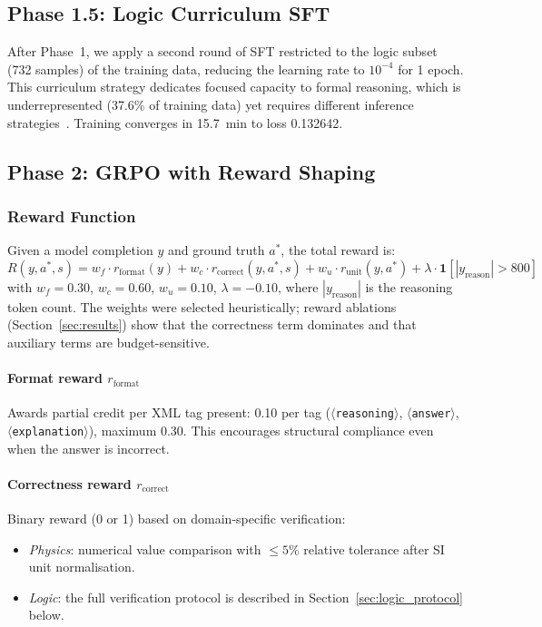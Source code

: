 \documentclass[cmc,journal,article,submit,moreauthors,pdftex]{Definitions/tsp}
\begin{document}
\subsection{Phase 1.5: Logic Curriculum SFT}

After Phase~1, we apply a second round of SFT restricted to the logic
subset (732 samples) of the training data, reducing the learning rate
to $10^{-4}$ for 1 epoch.
This curriculum strategy dedicates focused capacity to formal reasoning,
which is underrepresented (37.6\% of training data) yet requires
different inference strategies~\cite{Bengio2009}.
Training converges in 15.7~min to loss 0.132642.

\subsection{Phase 2: GRPO with Reward Shaping}\label{sec:grpo}

\subsubsection{Reward Function}

Given a model completion $y$ and ground truth $a^*$, the total reward is:
\begin{equation}
  R(y, a^*, s) =
    w_f \cdot r_{\text{format}}(y)
  + w_c \cdot r_{\text{correct}}(y, a^*, s)
  + w_u \cdot r_{\text{unit}}(y, a^*)
  + \lambda \cdot \mathbf{1}[|y_{\text{reason}}| > 800]
  \tag{4}
  \label{eq:reward}
\end{equation}
with $w_f = 0.30$, $w_c = 0.60$, $w_u = 0.10$, $\lambda = -0.10$,
where $|y_{\text{reason}}|$ is the reasoning token count.
The weights were selected heuristically; reward ablations
(Section~\ref{sec:results}) show that the correctness term dominates
and that auxiliary terms are budget-sensitive.

\paragraph{Format reward $r_{\text{format}}$}
Awards partial credit per XML tag present: 0.10 per tag
($\langle$\texttt{reasoning}$\rangle$, $\langle$\texttt{answer}$\rangle$,
$\langle$\texttt{explanation}$\rangle$), maximum 0.30.
This encourages structural compliance even when the answer is incorrect.

\paragraph{Correctness reward $r_{\text{correct}}$}
Binary reward (0 or 1) based on domain-specific verification:
\begin{itemize}
  \item \emph{Physics}: numerical value comparison with $\leq 5\%$
        relative tolerance after SI unit normalisation.
  \item \emph{Logic}: the full verification protocol is described in
        Section~\ref{sec:logic_protocol} below.
\end{itemize}
\end{document}
